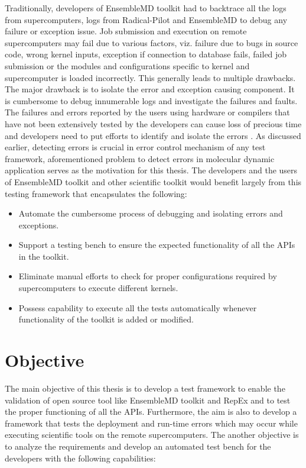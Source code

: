 \documentclass[10pt]{ruthesis}
\begin{document}
Traditionally, developers of EnsembleMD toolkit had to backtrace all the logs from supercomputers, logs from Radical-Pilot and EnsembleMD to debug any failure or exception issue. Job submission and execution on remote supercomputers may fail due to various factors, viz. failure due to bugs in source code, wrong kernel inputs, exception if connection to database fails, failed job submission or the modules and configurations specific to kernel and supercomputer is loaded incorrectly. This generally leads to multiple drawbacks. The major drawback is to isolate the error and exception causing component. It is cumbersome to debug innumerable logs and investigate the failures and faults. The failures and errors reported by the users using hardware or compilers that have not been extensively tested by the developers can cause loss of precious time and developers need to put efforts to identify and isolate the errors \cite{ref16}. As discussed earlier, detecting errors is crucial in error control mechanism of any test framework, aforementioned problem to detect errors in molecular dynamic application serves as the motivation for this thesis. The developers and the users of EnsembleMD toolkit and other scientific toolkit would benefit largely from this testing framework that encapsulates the following:

\begin{itemize}
	\item Automate the cumbersome process of debugging and isolating errors and exceptions.
	\item Support a testing bench to ensure the expected functionality of all the APIs in the toolkit.
	\item Eliminate manual efforts to check for proper configurations required by supercomputers to execute different kernels.
	\item Possess capability to execute all the tests automatically whenever functionality of the toolkit is added or modified. 
\end{itemize} 

\section{Objective}
The main objective of this thesis is to develop a test framework to enable the validation of open source tool like EnsembleMD toolkit and RepEx and to test the proper functioning of all the APIs. Furthermore, the aim is also to develop a framework that tests the deployment and run-time errors which may occur while executing scientific tools on the remote supercomputers. The another objective is to analyze the requirements and develop an automated test bench for the developers with the following capabilities:
\end{document}
